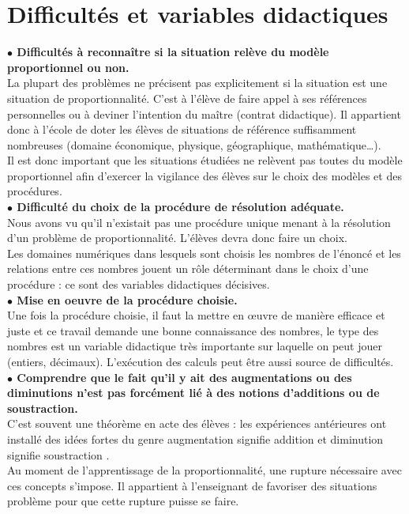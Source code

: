 \section{Difficultés et variables didactiques}

{\bf $\bullet$ Difficultés à reconnaître si la situation relève du modèle proportionnel ou non.} \\
   La plupart des problèmes ne précisent pas explicitement si la situation est une situation de proportionnalité. C'est à l'élève de faire appel à ses références personnelles ou à deviner l'intention du maître (contrat didactique). Il appartient donc à l'école de doter les élèves de situations de référence suffisamment nombreuses (domaine économique, physique, géographique, mathématique\dots). \\
   Il est donc important que les situations étudiées ne relèvent pas toutes du modèle proportionnel afin d'exercer la vigilance des élèves sur le choix des modèles et des procédures. \\

{\bf $\bullet$ Difficulté du choix de la procédure de résolution adéquate.} \\
    Nous avons vu qu'il n'existait pas une procédure unique menant à la résolution d'un problème de proportionnalité. L'élèves devra donc faire un choix. \\
    Les domaines numériques dans lesquels sont choisis les nombres de l'énoncé et les relations entre ces nombres jouent un rôle déterminant dans le choix d'une procédure : ce sont des variables didactiques décisives. \\

{\bf $\bullet$ Mise en oeuvre de la procédure choisie.} \\
   Une fois la procédure choisie, il faut la mettre en \oe uvre de manière efficace et juste et ce travail demande une bonne connaissance des nombres, le type des nombres est un variable didactique très importante sur laquelle on peut jouer (entiers, décimaux). L'exécution des calculs peut être aussi source de difficultés. \\

{\bf $\bullet$ Comprendre que le fait qu'il y ait des augmentations ou des diminutions n'est pas forcément lié à des notions d'additions ou de soustraction.} \\
   C'est souvent une \og théorème en acte \fg{} des élèves : les expériences antérieures ont installé des idées fortes du genre \og augmentation signifie addition et diminution signifie soustraction \fg. \\
   Au moment de l'apprentissage de la proportionnalité, une rupture nécessaire avec ces concepts s'impose. Il appartient à l'enseignant de favoriser des situations problème pour que cette rupture puisse se faire. \\


